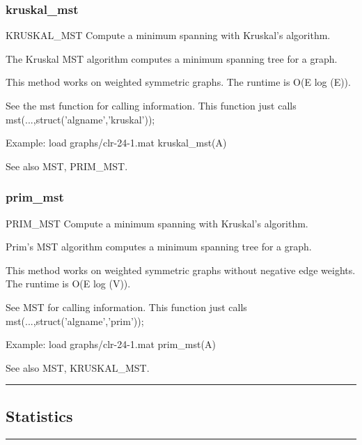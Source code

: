 \subsubsection*{kruskal\_mst}
\begin{mcode}
  KRUSKAL_MST Compute a minimum spanning with Kruskal's algorithm.
 
  The Kruskal MST algorithm computes a minimum spanning tree for a graph.
 
  This method works on weighted symmetric graphs.
  The runtime is O(E log (E)).
 
  See the mst function for calling information.  This function just calls
  mst(...,struct('algname','kruskal'));
 
  Example:
     load graphs/clr-24-1.mat
     kruskal_mst(A)
 
  See also MST, PRIM_MST.
\end{mcode}
\newpage
\subsubsection*{prim\_mst}
\begin{mcode}
  PRIM_MST Compute a minimum spanning with Kruskal's algorithm.
 
  Prim's MST algorithm computes a minimum spanning tree for a graph.
 
  This method works on weighted symmetric graphs without negative edge
  weights.
  The runtime is O(E log (V)).
 
  See MST for calling information.  This function just calls
  mst(...,struct('algname','prim'));
 
  Example:
     load graphs/clr-24-1.mat
     prim_mst(A)
 
  See also MST, KRUSKAL_MST.
\end{mcode}
\newpage
\hrule
\subsection*{Statistics}
\vspace{1cm}
\hrule
